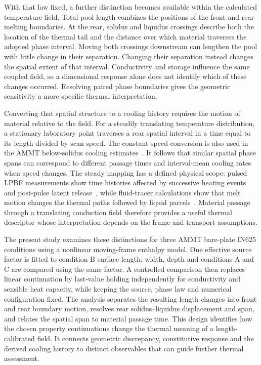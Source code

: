 With that law fixed, a further distinction becomes available within the calculated temperature field. Total pool length combines the positions of the front and rear melting boundaries. At the rear, solidus and liquidus crossings describe both the location of the thermal tail and the distance over which material traverses the adopted phase interval. Moving both crossings downstream can lengthen the pool with little change in their separation. Changing their separation instead changes the spatial extent of that interval. Conductivity and storage influence the same coupled field, so a dimensional response alone does not identify which of these changes occurred. Resolving paired phase boundaries gives the geometric sensitivity a more specific thermal interpretation.

Converting that spatial structure to a cooling history requires the motion of material relative to the field. For a steadily translating temperature distribution, a stationary laboratory point traverses a rear spatial interval in a time equal to its length divided by scan speed. The constant-speed conversion is also used in the AMMT below-solidus cooling estimates~\cite{lane2020}. It follows that similar spatial phase spans can correspond to different passage times and interval-mean cooling rates when speed changes. The steady mapping has a defined physical scope: pulsed LPBF measurements show time histories affected by successive heating events and post-pulse latent release~\cite{hooper2018}, while fluid-tracer calculations show that melt motion changes the thermal paths followed by liquid parcels~\cite{Hou2024Dissolution}. Material passage through a translating conduction field therefore provides a useful thermal descriptor whose interpretation depends on the frame and transport assumptions.

The present study examines these distinctions for three AMMT bare-plate IN625 conditions using a nonlinear moving-frame enthalpy model. One effective source factor is fitted to condition B surface length; width, depth and conditions A and C are compared using the same factor. A controlled comparison then replaces linear continuation by last-value holding independently for conductivity and sensible heat capacity, while keeping the source, phase law and numerical configuration fixed. The analysis separates the resulting length changes into front and rear boundary motion, resolves rear solidus--liquidus displacement and span, and relates the spatial span to material passage time. This design identifies how the chosen property continuations change the thermal meaning of a length-calibrated field. It connects geometric discrepancy, constitutive response and the derived cooling history to distinct observables that can guide further thermal assessment.
